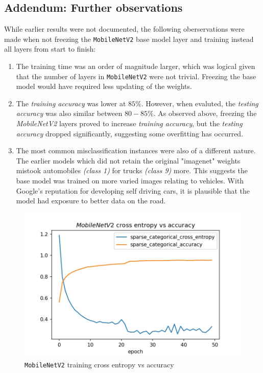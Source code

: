 \documentclass[12pt, letterpaper]{article}
\begin{document}
\subsection{Addendum: Further observations}

While earlier results were not documented, the following oberservations were made when not freezing the \texttt{MobileNetV2} base model layer and training instead all layers from start to finish:

\begin{enumerate}
    \item The training time was an order of magnitude larger, which was logical given that the number of layers in \texttt{MobileNetV2} were not trivial. Freezing the base model would have required less updating of the weights.
    \item The \textit{training accuracy} was lower at $85\%$. However, when evaluted, the \textit{testing accuracy} was also similar between $80-85\%$. As observed above, freezing the \textit{MobileNetV2} layers proved to increase \textit{training accuracy}, but the \textit{testing accuracy} dropped significantly, suggesting some overfitting has occurred.
    \item The most common misclassification instances were also of a different nature. The earlier models which did not retain the original "imagenet" weights mistook automobiles \textit{(class 1)} for trucks \textit{(class 9)} more. This suggests the base model was trained on more varied images relating to vehicles. With Google's reputation for developing self driving cars, it is plausible that the model had exposure to better data on the road.
\end{enumerate}

\begin{figure}[h!]
\includegraphics[width=\linewidth]{history_cross_entropy_accuracy.jpeg}
\caption{\texttt{MobileNetV2} training cross entropy vs accuracy}
\label{fig:mobilenetv2-2}
\end{figure}
\end{document}
